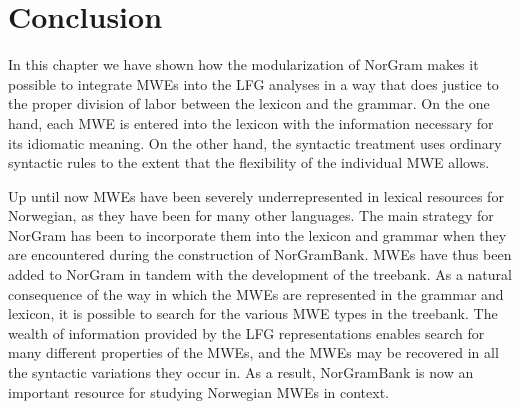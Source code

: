 \documentclass[output=paper]{langsci/langscibook}
\begin{document}

\section{Conclusion}\label{sec:mweiness:conc}

In this chapter we have shown how the modularization of NorGram makes it possible to integrate MWEs into the LFG analyses in a way that does justice to the proper division of labor between the lexicon and the grammar.
On the one hand, each MWE is entered into the lexicon with the information necessary for its idiomatic meaning.
On the other hand, the syntactic treatment uses ordinary syntactic rules to the extent that the flexibility of the individual MWE allows.

Up until now MWEs have been severely underrepresented in lexical resources for Norwegian, as they have been for many other languages.
The main strategy for NorGram has been to incorporate them into the lexicon and grammar when they are encountered during the construction of NorGramBank.
MWEs have thus been added to NorGram in tandem with the development of the treebank.
As a natural consequence of the way in which the MWEs are represented in the grammar and lexicon, it is possible to search for the various MWE types in the treebank.
The wealth of information provided by the LFG representations enables search for many different properties of the MWEs, and the MWEs may be recovered in all the syntactic variations they occur in.
As a result, NorGramBank is now an important resource for studying Norwegian MWEs in context.

\end{document}
